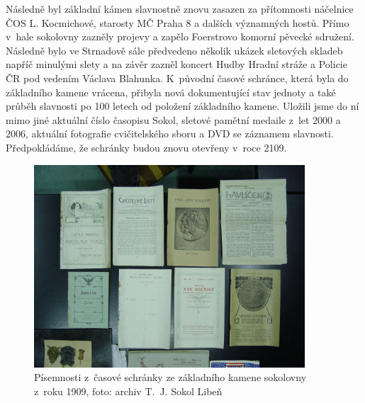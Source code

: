 \documentclass[a5paper, 11pt, twoside]{article}
\begin{document}
Následně byl základní kámen slavnostně znovu zasazen za přítomnosti
náčelnice ČOS L. Kocmichové, starosty MČ Praha 8 a dalších významných
hostů. Přímo v~hale sokolovny zazněly projevy a zapělo Foerstrovo
komorní pěvecké sdružení. Následně bylo ve Strnadově sále předvedeno
několik ukázek sletových skladeb napříč minulými slety a na závěr zazněl
koncert Hudby Hradní stráže a Policie ČR pod vedením Václava Blahunka.
K~původní časové schránce, která byla do základního kamene vrácena,
přibyla nová dokumentující stav jednoty a také průběh slavnosti po 100
letech od položení základního kamene. Uložili jsme do ní mimo jiné
aktuální číslo časopisu Sokol, sletové pamětní medaile z~let 2000 a
2006, aktuální fotografie cvičitelského sboru a DVD se záznamem
slavnosti. Předpokládáme, že schránky budou znovu otevřeny v~roce 2109.

\begin{figure}[h]
  \centering 
  \includegraphics[width=0.9\textwidth]{img/59_schranka_2.jpg}
  \caption*{Písemnosti z~časové schránky ze základního kamene sokolovny z~roku
  1909, foto: archiv T.~J. Sokol Libeň}
\end{figure}
\end{document}
